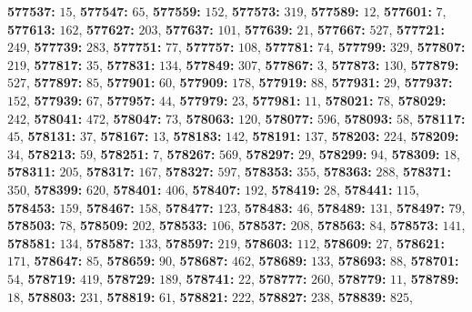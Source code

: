 \textsf{\bfseries 577537:} $15$, \textsf{\bfseries 577547:} $65$, \textsf{\bfseries 577559:} $152$, \textsf{\bfseries 577573:} $319$, \textsf{\bfseries 577589:} $12$, \textsf{\bfseries 577601:} $7$, \textsf{\bfseries 577613:} $162$, \textsf{\bfseries 577627:} $203$, \textsf{\bfseries 577637:} $101$, \textsf{\bfseries 577639:} $21$, \textsf{\bfseries 577667:} $527$, \textsf{\bfseries 577721:} $249$, \textsf{\bfseries 577739:} $283$, \textsf{\bfseries 577751:} $77$, \textsf{\bfseries 577757:} $108$, \textsf{\bfseries 577781:} $74$, \textsf{\bfseries 577799:} $329$, \textsf{\bfseries 577807:} $219$, \textsf{\bfseries 577817:} $35$, \textsf{\bfseries 577831:} $134$, \textsf{\bfseries 577849:} $307$, \textsf{\bfseries 577867:} $3$, \textsf{\bfseries 577873:} $130$, \textsf{\bfseries 577879:} $527$, \textsf{\bfseries 577897:} $85$, \textsf{\bfseries 577901:} $60$, \textsf{\bfseries 577909:} $178$, \textsf{\bfseries 577919:} $88$, \textsf{\bfseries 577931:} $29$, \textsf{\bfseries 577937:} $152$, \textsf{\bfseries 577939:} $67$, \textsf{\bfseries 577957:} $44$, \textsf{\bfseries 577979:} $23$, \textsf{\bfseries 577981:} $11$, \textsf{\bfseries 578021:} $78$, \textsf{\bfseries 578029:} $242$, \textsf{\bfseries 578041:} $472$, \textsf{\bfseries 578047:} $73$, \textsf{\bfseries 578063:} $120$, \textsf{\bfseries 578077:} $596$, \textsf{\bfseries 578093:} $58$, \textsf{\bfseries 578117:} $45$, \textsf{\bfseries 578131:} $37$, \textsf{\bfseries 578167:} $13$, \textsf{\bfseries 578183:} $142$, \textsf{\bfseries 578191:} $137$, \textsf{\bfseries 578203:} $224$, \textsf{\bfseries 578209:} $34$, \textsf{\bfseries 578213:} $59$, \textsf{\bfseries 578251:} $7$, \textsf{\bfseries 578267:} $569$, \textsf{\bfseries 578297:} $29$, \textsf{\bfseries 578299:} $94$, \textsf{\bfseries 578309:} $18$, \textsf{\bfseries 578311:} $205$, \textsf{\bfseries 578317:} $167$, \textsf{\bfseries 578327:} $597$, \textsf{\bfseries 578353:} $355$, \textsf{\bfseries 578363:} $288$, \textsf{\bfseries 578371:} $350$, \textsf{\bfseries 578399:} $620$, \textsf{\bfseries 578401:} $406$, \textsf{\bfseries 578407:} $192$, \textsf{\bfseries 578419:} $28$, \textsf{\bfseries 578441:} $115$, \textsf{\bfseries 578453:} $159$, \textsf{\bfseries 578467:} $158$, \textsf{\bfseries 578477:} $123$, \textsf{\bfseries 578483:} $46$, \textsf{\bfseries 578489:} $131$, \textsf{\bfseries 578497:} $79$, \textsf{\bfseries 578503:} $78$, \textsf{\bfseries 578509:} $202$, \textsf{\bfseries 578533:} $106$, \textsf{\bfseries 578537:} $208$, \textsf{\bfseries 578563:} $84$, \textsf{\bfseries 578573:} $141$, \textsf{\bfseries 578581:} $134$, \textsf{\bfseries 578587:} $133$, \textsf{\bfseries 578597:} $219$, \textsf{\bfseries 578603:} $112$, \textsf{\bfseries 578609:} $27$, \textsf{\bfseries 578621:} $171$, \textsf{\bfseries 578647:} $85$, \textsf{\bfseries 578659:} $90$, \textsf{\bfseries 578687:} $462$, \textsf{\bfseries 578689:} $133$, \textsf{\bfseries 578693:} $88$, \textsf{\bfseries 578701:} $54$, \textsf{\bfseries 578719:} $419$, \textsf{\bfseries 578729:} $189$, \textsf{\bfseries 578741:} $22$, \textsf{\bfseries 578777:} $260$, \textsf{\bfseries 578779:} $11$, \textsf{\bfseries 578789:} $18$, \textsf{\bfseries 578803:} $231$, \textsf{\bfseries 578819:} $61$, \textsf{\bfseries 578821:} $222$, \textsf{\bfseries 578827:} $238$, \textsf{\bfseries 578839:} $825$, 
